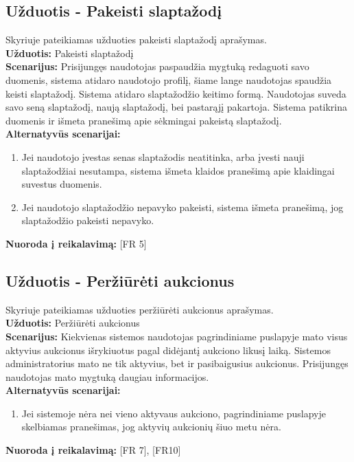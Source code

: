 \documentclass{VUMIFPSkursinis}
\begin{document}
	\subsection{Užduotis - Pakeisti slaptažodį}
	Skyriuje pateikiamas užduoties pakeisti slaptažodį aprašymas.\\
	\textbf{Užduotis:}  Pakeisti slaptažodį \\
	\textbf{Scenarijus:} Prisijungęs naudotojas paspaudžia mygtuką redaguoti savo duomenis, sistema atidaro naudotojo profilį, šiame lange naudotojas spaudžia keisti slaptažodį. Sistema atidaro slaptažodžio keitimo formą. Naudotojas suveda savo seną slaptažodį, naują slaptažodį, bei pastarąjį pakartoja. Sistema patikrina duomenis ir išmeta pranešimą apie sėkmingai pakeistą slaptažodį. \\
	\textbf{Alternatyvūs scenarijai:}
	\begin{enumerate}
		\item Jei naudotojo įvestas senas slaptažodis neatitinka, arba įvesti nauji slaptažodžiai nesutampa, sistema išmeta klaidos pranešimą apie klaidingai suvestus duomenis. 
		\item Jei naudotojo slaptažodžio nepavyko pakeisti, sistema išmeta pranešimą, jog slaptažodžio pakeisti nepavyko. 
	\end{enumerate}
	\textbf{Nuoroda į reikalavimą: } [FR 5]
	
	\subsection{Užduotis - Peržiūrėti aukcionus}
	Skyriuje pateikiamas užduoties peržiūrėti aukcionus aprašymas.\\
	\textbf{Užduotis:}  Peržiūrėti aukcionus \\
	\textbf{Scenarijus:} Kiekvienas sistemos naudotojas pagrindiniame puslapyje mato visus aktyvius aukcionus išrykiuotus pagal didėjantį aukciono likusį laiką. Sistemos administratorius mato ne tik aktyvius, bet ir pasibaigusius aukcionus. Prisijungęs naudotojas mato mygtuką daugiau informacijos. \\
	\textbf{Alternatyvūs scenarijai:}
	\begin{enumerate}
		\item Jei sistemoje nėra nei vieno aktyvaus aukciono, pagrindiniame puslapyje skelbiamas pranešimas, jog aktyvių aukcionių šiuo metu nėra. 
	\end{enumerate}
	\textbf{Nuoroda į reikalavimą: } [FR 7], [FR10]
	
\end{document}
